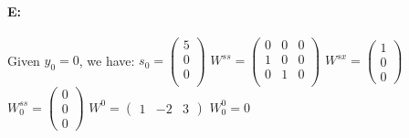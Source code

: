 \documentclass{article}
\begin{document}
\paragraph{E: } Given $y_0=0$, we have: \newline
$s_0=\begin{pmatrix}
    5 \\
    0 \\
    0 \\
\end{pmatrix}$ \newline
$W^{ss}=\begin{pmatrix}
    0&0&0 \\
    1&0&0 \\
    0&1&0 \\
\end{pmatrix}$ \newline
$W^{sx}=\begin{pmatrix}
    1\\
    0\\
    0
\end{pmatrix}$ \newline
$W_0^{ss}=\begin{pmatrix}
    0\\
    0\\
    0
\end{pmatrix}$ \newline
$W^0=\begin{pmatrix}
    1&-2&3
\end{pmatrix}$ \newline
$W_0^0=0$
\end{document}
